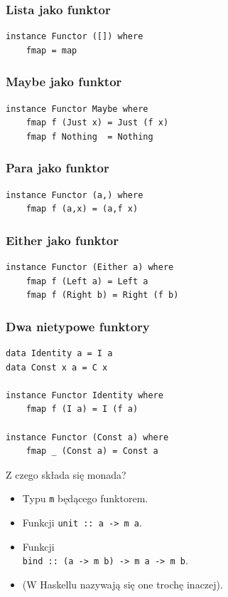 \documentclass[14pt]{beamer}
\begin{document}
\begin{frame}[fragile]
\frametitle{Lista jako funktor}
\begin{verbatim}
instance Functor ([]) where
    fmap = map
\end{verbatim}
\end{frame}

\begin{frame}[fragile]
\frametitle{Maybe jako funktor}
\begin{verbatim}
instance Functor Maybe where
    fmap f (Just x) = Just (f x)
    fmap f Nothing  = Nothing
\end{verbatim}
\end{frame}

\begin{frame}[fragile]
\frametitle{Para jako funktor}
\begin{verbatim}
instance Functor (a,) where
    fmap f (a,x) = (a,f x)
\end{verbatim}
\end{frame}

\begin{frame}[fragile]
\frametitle{Either jako funktor}
\begin{verbatim}
instance Functor (Either a) where
    fmap f (Left a) = Left a
    fmap f (Right b) = Right (f b)
\end{verbatim}
\end{frame}

\begin{frame}[fragile]
\frametitle{Dwa nietypowe funktory}
\begin{verbatim}
data Identity a = I a
data Const x a = C x

instance Functor Identity where
    fmap f (I a) = I (f a)

instance Functor (Const a) where
    fmap _ (Const a) = Const a
\end{verbatim}
\end{frame}

\begin{frame}{Z czego składa się monada?}
    \begin{itemize}
        \item Typu \texttt{m} będącego funktorem.
        \item Funkcji \texttt{unit :: a -> m a}.
        \item Funkcji\\
            \texttt{bind :: (a -> m b) -> m a -> m b}.
        \pause
        \item (W Haskellu nazywają się one trochę inaczej).
    \end{itemize}
\end{frame}
\end{document}
